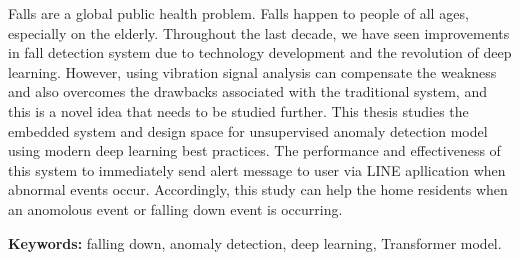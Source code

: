
\setlength{\parindent}{0in}
\setlength{\parskip}{1em}
\setlength{\baselineskip}{1.6em}

\begin{center}
  \fontsize{14}{17}
\end{center}
\vspace{2em}

Falls are a global public health problem. Falls happen to people of all ages, especially on the elderly. Throughout the last decade, we have seen improvements in fall detection system due to technology development and the revolution of deep learning. However, using vibration signal analysis can compensate the weakness and also overcomes the drawbacks associated with the traditional system, and this is a novel idea that needs to be studied further. This thesis studies the embedded system and design space for unsupervised anomaly detection model using modern deep learning best practices. The performance and effectiveness of this system to immediately send alert message to user via LINE apllication when abnormal events occur. Accordingly, this study can help the home residents when an anomolous event or falling down event is occurring.

\textbf{Keywords:} falling down, anomaly detection, deep learning, Transformer model.